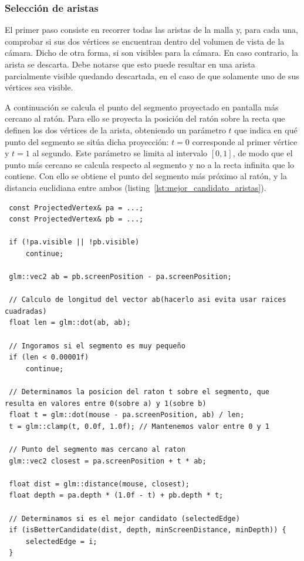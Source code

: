 \subsubsection{Selección de aristas}

El primer paso consiste en recorrer todas las aristas de la malla y, para cada una, comprobar si sus dos vértices se encuentran dentro del volumen de vista de la cámara. Dicho de otra forma, si son visibles para la cámara. En caso contrario, la arista se descarta. Debe notarse que esto puede resultar en una arista parcialmente visible quedando descartada, en el caso de que solamente uno de sus vértices sea visible.

A continuación se calcula el punto del segmento proyectado en pantalla más cercano al ratón. Para ello se proyecta la posición del ratón sobre la recta que definen los dos vértices de la arista, obteniendo un parámetro $t$ que indica en qué punto del segmento se sitúa dicha proyección: $t = 0$ corresponde al primer vértice y $t = 1$ al segundo. Este parámetro se limita al intervalo $[0, 1]$, de modo que el punto más cercano se calcula respecto al segmento y no a la recta infinita que lo contiene. Con ello se obtiene el punto del segmento más próximo al ratón, y la distancia euclidiana entre ambos (listing~\ref{lst:mejor_candidato_aristas}).

\begin{listing}[htb]
\begin{verbatim}
 const ProjectedVertex& pa = ...;
 const ProjectedVertex& pb = ...;

 if (!pa.visible || !pb.visible)
     continue;

 glm::vec2 ab = pb.screenPosition - pa.screenPosition;

 // Calculo de longitud del vector ab(hacerlo asi evita usar raices cuadradas)
 float len = glm::dot(ab, ab);

 // Ingoramos si el segmento es muy pequeño
 if (len < 0.00001f)
     continue;

 // Determinamos la posicion del raton t sobre el segmento, que resulta en valores entre 0(sobre a) y 1(sobre b)
 float t = glm::dot(mouse - pa.screenPosition, ab) / len;
 t = glm::clamp(t, 0.0f, 1.0f); // Mantenemos valor entre 0 y 1

 // Punto del segmento mas cercano al raton
 glm::vec2 closest = pa.screenPosition + t * ab;

 float dist = glm::distance(mouse, closest);
 float depth = pa.depth * (1.0f - t) + pb.depth * t;

 // Determinamos si es el mejor candidato (selectedEdge)
 if (isBetterCandidate(dist, depth, minScreenDistance, minDepth)) {
     selectedEdge = i;
 }
\end{verbatim}
\caption{Determinación de mejor candidato entre aristas.}
\label{lst:mejor_candidato_aristas}
\end{listing}

